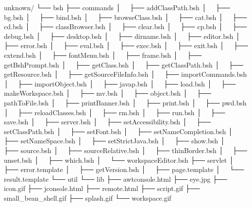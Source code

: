 \documentclass[
]{article}
\newenvironment{Shaded}{}{}
\newcommand{\NormalTok}[1]{#1}
\begin{document}
\begin{Shaded}
\begin{Highlighting}[]
\NormalTok{unknown/}
\NormalTok{└── bsh}
\NormalTok{    ├── commands}
\NormalTok{    │   ├── addClassPath.bsh}
\NormalTok{    │   ├── bg.bsh}
\NormalTok{    │   ├── bind.bsh}
\NormalTok{    │   ├── browseClass.bsh}
\NormalTok{    │   ├── cat.bsh}
\NormalTok{    │   ├── cd.bsh}
\NormalTok{    │   ├── classBrowser.bsh}
\NormalTok{    │   ├── clear.bsh}
\NormalTok{    │   ├── cp.bsh}
\NormalTok{    │   ├── debug.bsh}
\NormalTok{    │   ├── desktop.bsh}
\NormalTok{    │   ├── dirname.bsh}
\NormalTok{    │   ├── editor.bsh}
\NormalTok{    │   ├── error.bsh}
\NormalTok{    │   ├── eval.bsh}
\NormalTok{    │   ├── exec.bsh}
\NormalTok{    │   ├── exit.bsh}
\NormalTok{    │   ├── extend.bsh}
\NormalTok{    │   ├── fontMenu.bsh}
\NormalTok{    │   ├── frame.bsh}
\NormalTok{    │   ├── getBshPrompt.bsh}
\NormalTok{    │   ├── getClass.bsh}
\NormalTok{    │   ├── getClassPath.bsh}
\NormalTok{    │   ├── getResource.bsh}
\NormalTok{    │   ├── getSourceFileInfo.bsh}
\NormalTok{    │   ├── importCommands.bsh}
\NormalTok{    │   ├── importObject.bsh}
\NormalTok{    │   ├── javap.bsh}
\NormalTok{    │   ├── load.bsh}
\NormalTok{    │   ├── makeWorkspace.bsh}
\NormalTok{    │   ├── mv.bsh}
\NormalTok{    │   ├── object.bsh}
\NormalTok{    │   ├── pathToFile.bsh}
\NormalTok{    │   ├── printBanner.bsh}
\NormalTok{    │   ├── print.bsh}
\NormalTok{    │   ├── pwd.bsh}
\NormalTok{    │   ├── reloadClasses.bsh}
\NormalTok{    │   ├── rm.bsh}
\NormalTok{    │   ├── run.bsh}
\NormalTok{    │   ├── save.bsh}
\NormalTok{    │   ├── server.bsh}
\NormalTok{    │   ├── setAccessibility.bsh}
\NormalTok{    │   ├── setClassPath.bsh}
\NormalTok{    │   ├── setFont.bsh}
\NormalTok{    │   ├── setNameCompletion.bsh}
\NormalTok{    │   ├── setNameSpace.bsh}
\NormalTok{    │   ├── setStrictJava.bsh}
\NormalTok{    │   ├── show.bsh}
\NormalTok{    │   ├── source.bsh}
\NormalTok{    │   ├── sourceRelative.bsh}
\NormalTok{    │   ├── thinBorder.bsh}
\NormalTok{    │   ├── unset.bsh}
\NormalTok{    │   ├── which.bsh}
\NormalTok{    │   └── workspaceEditor.bsh}
\NormalTok{    ├── servlet}
\NormalTok{    │   ├── error.template}
\NormalTok{    │   ├── getVersion.bsh}
\NormalTok{    │   ├── page.template}
\NormalTok{    │   └── result.template}
\NormalTok{    └── util}
\NormalTok{        └── lib}
\NormalTok{            ├── awtconsole.html}
\NormalTok{            ├── eye.jpg}
\NormalTok{            ├── icon.gif}
\NormalTok{            ├── jconsole.html}
\NormalTok{            ├── remote.html}
\NormalTok{            ├── script.gif}
\NormalTok{            ├── small\_bean\_shell.gif}
\NormalTok{            ├── splash.gif}
\NormalTok{            └── workspace.gif}
\end{Highlighting}
\end{Shaded}
\end{document}
